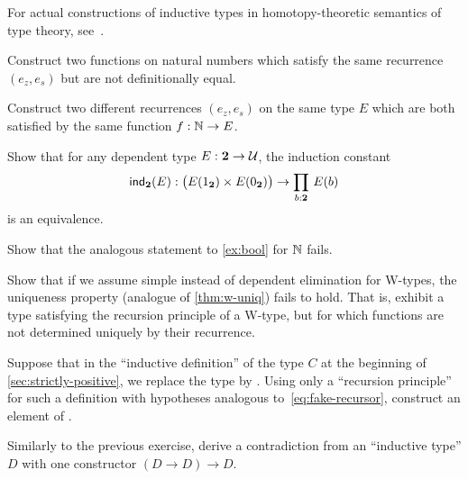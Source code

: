 For actual constructions of inductive types in homotopy-theoretic semantics of type theory, see~\cite{klv:ssetmodel,mvdb:wtypes,ls:hits}.

\sectionExercises

\begin{ex}\label{ex:same-recurrence-not-defeq}
  Construct two functions on natural numbers which satisfy the same recurrence $(e_z, e_s)$ but are not definitionally equal.
\end{ex}

\begin{ex}\label{ex:one-function-two-recurrences}
  Construct two different recurrences $(e_z,e_s)$ on the same type $E$ which are both satisfied by the same function $f:\mathbb{N}\to E$.
\end{ex}

\begin{ex}\label{ex:bool}
  Show that for any dependent type $E : \mathbf{2} \to \mathcal{U}$, the induction constant
  \[ \ind{\two}(E) : \big(E(\true) \times E(\false)\big) \to \prd{b : \two} E(b) \]
  is an equivalence.
\end{ex}

\begin{ex}
  Show that the analogous statement to \autoref{ex:bool} for $\mathbb{N}$ fails.
\end{ex}

\begin{ex}
  Show that if we assume simple instead of dependent elimination for W-types, the uniqueness property (analogue of \autoref{thm:w-uniq}) fails to hold.
  That is, exhibit a type satisfying the recursion principle of a W-type, but for which functions are not determined uniquely by their recurrence.
\end{ex}

\begin{ex}\label{ex:loop}
  Suppose that in the ``inductive definition'' of the type $C$ at the beginning of \autoref{sec:strictly-positive}, we replace the type \nat by \emptyt.
  Using only a ``recursion principle'' for such a definition with hypotheses analogous to~\eqref{eq:fake-recursor}, construct an element of \emptyt.
\end{ex}

\begin{ex}\label{ex:loop2}
  Similarly to the previous exercise, derive a contradiction from an ``inductive type'' $D$ with one constructor $(D\to D) \to D$.
\end{ex}


